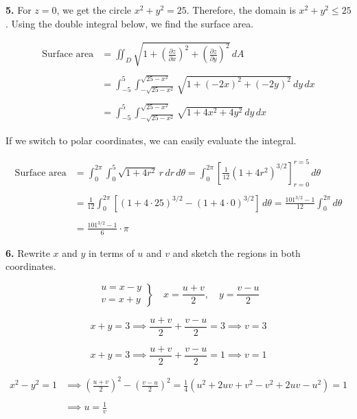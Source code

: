 \documentclass{article}
\begin{document}
\textbf{5.} For $z=0$, we get the circle $x^2+y^2=25$. Therefore, the domain is $x^2+y^2\leq25$. Using the double integral below, we find the surface area.

\begin{align*}
\text{Surface area}&=\iint_D\sqrt{1+\left(\frac{\partial z}{\partial x}\right)^2 +\left(\frac{\partial z}{\partial y}\right)^2}\,dA\\\\&=\int_{-5}^5\int_{-\sqrt{25-x^2}}^{\sqrt{25-x^2}}\sqrt{1+\left(-2x\right)^2 +\left(-2y\right)^2}\,dy\,dx\\\\&=\int_{-5}^5\int_{-\sqrt{25-x^2}}^{\sqrt{25-x^2}}\sqrt{1+4x^2+4y^2}\,dy\,dx
\end{align*}

If we switch to polar coordinates, we can easily evaluate the integral.

\begin{align*}\text{Surface area}&=\int_0^{2\pi}\int_0^5\sqrt{1+4r^2}\,r\,dr\,d\theta=\int_0^{2\pi}\left[\frac1{12}\left(1+4r^2\right)^{3/2}\right]_{r=0}^{r=5}\,d\theta\\\\&=\frac1{12}\int_0^{2\pi}\left[\left(1+4\cdot25\right)^{3/2}-\left(1+4\cdot0\right)^{3/2}\right]\,d\theta=\frac{101^{3/2}-1}{12}\int_0^{2\pi}d\theta\\\\&=\boxed{\frac{101^{3/2}-1}6\cdot\pi}\end{align*}

\vspace{1em}

\textbf{6.} Rewrite $x$ and $y$ in terms of $u$ and $v$ and sketch the regions in both coordinates.

\[
\left.
\begin{array}{c}
u=x-y\\v=x+y
\end{array}\right\}
\quad \displaystyle x=\frac{u+v}2,\quad y=\frac{v-u}2
\]

\[x+y=3\implies\frac{u+v}2+\frac{v-u}2=3\implies v=3\]

\[x+y=3\implies\frac{u+v}2+\frac{v-u}2=1\implies v=1\]

\begin{align*}x^2-y^2=1&\implies\left(\frac{u+v}2\right)^2-\left(\frac{v-u}2\right)^2=\frac14\left(u^2+2uv+v^2-v^2+2uv-u^2\right)=1\\\\&\implies u=\frac1v\end{align*}
\end{document}
